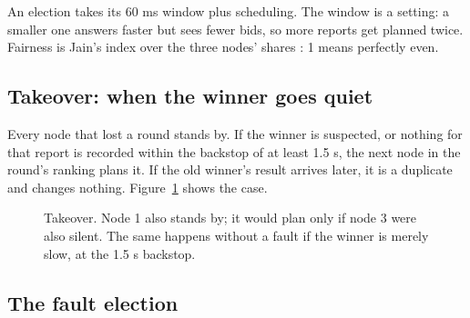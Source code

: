 An election takes its 60 ms window plus scheduling. The window is a setting: a smaller one answers faster but sees fewer bids, so more reports get planned twice. Fairness is Jain's index over the three nodes' shares \cite{jain}: 1 means perfectly even.

\subsection{Takeover: when the winner goes quiet}
\label{sec:takeover}

Every node that lost a round stands by. If the winner is suspected, or nothing for that report is recorded within the backstop of at least 1.5 s, the next node in the round's ranking plans it. If the old winner's result arrives later, it is a duplicate and changes nothing. Figure~\ref{fig:seq-takeover} shows the case.

\begin{figure}[!htb]
\centering
{}
\caption{Takeover. Node 1 also stands by; it would plan only if node 3 were also silent. The same happens without a fault if the winner is merely slow, at the 1.5 s backstop.}
\label{fig:seq-takeover}
\end{figure}

\subsection{The fault election}
\label{sec:faultelection}

